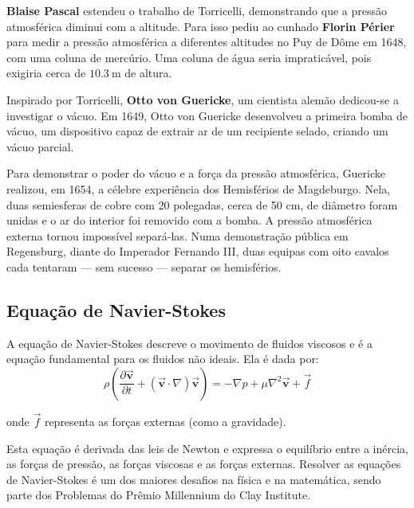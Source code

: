 \begin{historybox}
\textbf{Blaise Pascal} estendeu o trabalho de Torricelli, demonstrando que a pressão atmosférica diminui com a altitude. Para isso pediu ao cunhado \textbf{Florin Périer} para medir a pressão atmosférica a diferentes altitudes no Puy de Dôme em 1648, com uma coluna de mercúrio. Uma coluna de água seria impraticável, pois exigiria cerca de $10.3~\text{m}$ de altura.

\end{historybox}

\begin{historybox}

Inspirado por Torricelli, \textbf{Otto von Guericke}, um cientista alemão dedicou-se a investigar o vácuo. Em 1649, Otto von Guericke desenvolveu a primeira bomba de vácuo, um dispositivo capaz de extrair ar de um recipiente selado, criando um vácuo parcial. 

Para demonstrar o poder do vácuo e a força da pressão atmosférica, Guericke realizou, em 1654, a célebre experiência dos Hemisférios de Magdeburgo. Nela, duas semiesferas de cobre com 20 polegadas, cerca de 50 cm, de diâmetro foram unidas e o ar do interior foi removido com a bomba. A pressão atmosférica externa tornou impossível separá-las. Numa demonstração pública em Regensburg, diante do Imperador Fernando III, duas equipas com oito cavalos cada tentaram — sem sucesso — separar os hemisférios.

\end{historybox}

\subsection{Equação de Navier-Stokes}

A equação de Navier-Stokes descreve o movimento de fluidos viscosos e é a equação fundamental para os fluidos não ideais. Ela é dada por:
\begin{equation}
    \rho \left( \frac{\partial \vec{\mathbf{v}}}{\partial t} + (\vec{\mathbf{v}} \cdot \nabla) \vec{\mathbf{v}} \right) = -\nabla p + \mu \nabla^2 \vec{\mathbf{v}} + \vec{f}
\end{equation}

onde \( \vec{f} \) representa as forças externas (como a gravidade).

Esta equação é derivada das leis de Newton e expressa o equilíbrio entre a inércia, as forças de pressão, as forças viscosas e as forças externas. Resolver as equações de Navier-Stokes é um dos maiores desafios na física e na matemática, sendo parte dos Problemas do Prêmio Millennium do Clay Institute.

